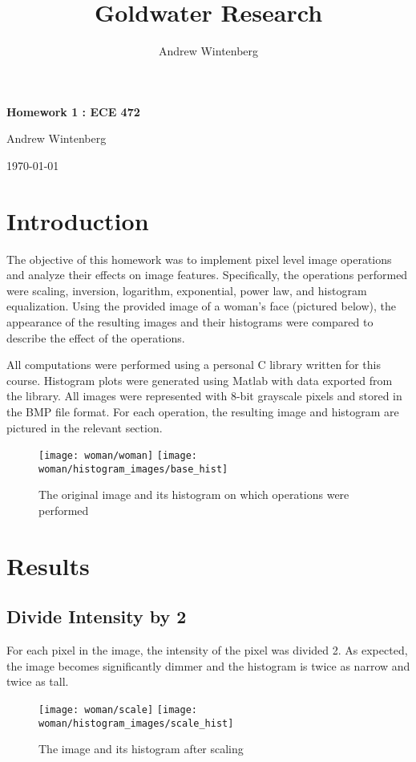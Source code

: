 \documentclass[12pt,letterpaper]{article}
\author{Andrew Wintenberg}
\title{Goldwater Research}
\begin{document}
\begin{center}
{\Large \textbf{Homework 1 : ECE 472 }}

{\large Andrew Wintenberg}

{\today}
\end{center}

\thispagestyle{empty}

\section{Introduction}

The objective of this homework was to implement pixel level image operations and analyze their effects on image features. Specifically, the operations performed were scaling, inversion, logarithm, exponential, power law, and histogram equalization. Using the provided image of a woman's face (pictured below), the appearance of the resulting images and their histograms were compared to describe the effect of the operations.

All computations were performed using a personal C library written for this course. Histogram plots were generated using Matlab with data exported from the library. All images were represented with 8-bit grayscale pixels and stored in the BMP file format. For each operation, the resulting image and histogram are pictured in the relevant section.


\begin{figure}[ht]
\centering
\texttt{[image: woman/woman]} \hspace{0.5cm} \texttt{[image: woman/histogram\_images/base\_hist]}
\caption{\small{The original image and its histogram on which operations were performed}
\label{fig:base} }
\end{figure}

\newpage

\section{Results}

\subsection{Divide Intensity by 2}
For each pixel in the image, the intensity of the pixel was divided 2. As expected, the image becomes significantly dimmer and the histogram is twice as narrow and twice as tall.

\begin{figure}[ht]
\centering
\texttt{[image: woman/scale]} \hspace{0.5cm} \texttt{[image: woman/histogram\_images/scale\_hist]}
\caption{\small{The image and its histogram after scaling}
\label{fig:div2} }
\end{figure}
\end{document}
